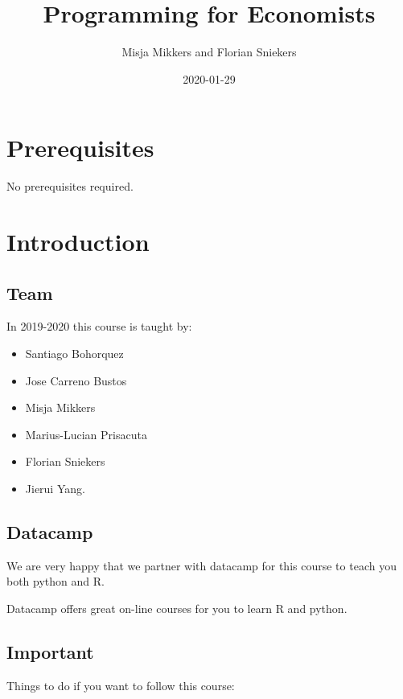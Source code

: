 \documentclass[]{book}
\title{Programming for Economists}
\author{Misja Mikkers and Florian Sniekers}
\date{2020-01-29}
\providecommand{\tightlist}{%
  \setlength{\itemsep}{0pt}\setlength{\parskip}{0pt}}
\begin{document}
\maketitle

{
\setcounter{tocdepth}{1}
\tableofcontents
}
\hypertarget{prerequisites}{%
\chapter{Prerequisites}\label{prerequisites}}

No prerequisites required.

\hypertarget{intro}{%
\chapter{Introduction}\label{intro}}

\hypertarget{team}{%
\section{Team}\label{team}}

In 2019-2020 this course is taught by:

\begin{itemize}
\tightlist
\item
  Santiago Bohorquez
\item
  Jose Carreno Bustos
\item
  Misja Mikkers
\item
  Marius-Lucian Prisacuta
\item
  Florian Sniekers
\item
  Jierui Yang.
\end{itemize}

\hypertarget{datacamp}{%
\section{Datacamp}\label{datacamp}}

We are very happy that we partner with datacamp for this course to teach you both python and R.

Datacamp offers great on-line courses for you to learn R and python.

\hypertarget{important}{%
\section{Important}\label{important}}

Things to do if you want to follow this course:
\end{document}
